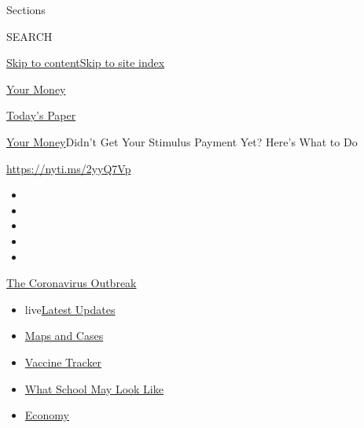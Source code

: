 Sections

SEARCH

\protect\hyperlink{site-content}{Skip to
content}\protect\hyperlink{site-index}{Skip to site index}

\href{https://www.nytimes.com/section/your-money}{Your Money}

\href{https://myaccount.nytimes.com/auth/login?response_type=cookie\&client_id=vi}{}

\href{https://www.nytimes.com/section/todayspaper}{Today's Paper}

\href{/section/your-money}{Your Money}\textbar{}Didn't Get Your Stimulus
Payment Yet? Here's What to Do

\url{https://nyti.ms/2yyQ7Vp}

\begin{itemize}
\item
\item
\item
\item
\item
\end{itemize}

\href{https://www.nytimes.com/news-event/coronavirus?action=click\&pgtype=Article\&state=default\&region=TOP_BANNER\&context=storylines_menu}{The
Coronavirus Outbreak}

\begin{itemize}
\tightlist
\item
  live\href{https://www.nytimes.com/2020/08/01/world/coronavirus-covid-19.html?action=click\&pgtype=Article\&state=default\&region=TOP_BANNER\&context=storylines_menu}{Latest
  Updates}
\item
  \href{https://www.nytimes.com/interactive/2020/us/coronavirus-us-cases.html?action=click\&pgtype=Article\&state=default\&region=TOP_BANNER\&context=storylines_menu}{Maps
  and Cases}
\item
  \href{https://www.nytimes.com/interactive/2020/science/coronavirus-vaccine-tracker.html?action=click\&pgtype=Article\&state=default\&region=TOP_BANNER\&context=storylines_menu}{Vaccine
  Tracker}
\item
  \href{https://www.nytimes.com/interactive/2020/07/29/us/schools-reopening-coronavirus.html?action=click\&pgtype=Article\&state=default\&region=TOP_BANNER\&context=storylines_menu}{What
  School May Look Like}
\item
  \href{https://www.nytimes.com/live/2020/07/31/business/stock-market-today-coronavirus?action=click\&pgtype=Article\&state=default\&region=TOP_BANNER\&context=storylines_menu}{Economy}
\end{itemize}

